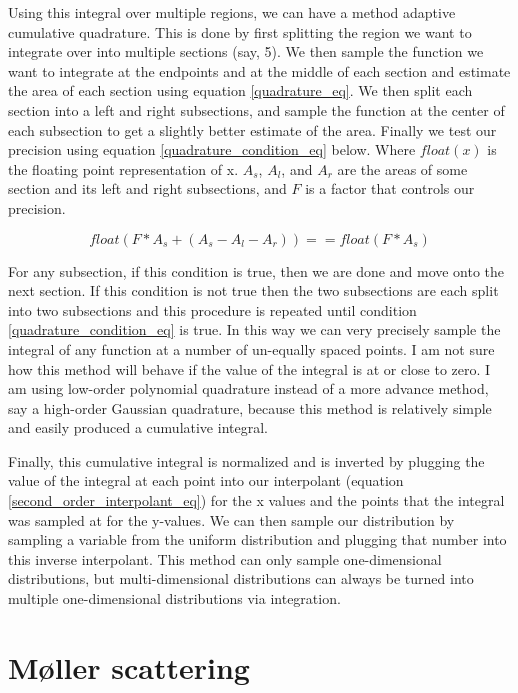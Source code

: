 \documentclass[]{article}
\begin{document}
Using this integral over multiple regions, we can have a method adaptive cumulative quadrature. This is done by first splitting the region we want to integrate over into multiple sections (say, 5). We then sample the function we want to integrate at the endpoints and at the middle of each section and estimate the area of each section using equation \ref{quadrature_eq}. We then split each section into a left and right subsections, and sample the function at the center of each subsection to get a slightly better estimate of the area.  Finally we test our precision using equation \ref{quadrature_condition_eq} below. Where $float(x)$ is the floating point representation of x. $A_s$, $A_l$, and $A_r$ are the areas of some section and its left and right subsections, and $F$ is a factor that controls our precision. 

\begin{equation}
\label{quadrature_condition_eq}
float(F*A_s + (A_s - A_l - A_r)) == float(F*A_s)
\end{equation}

For any subsection, if this condition is true, then we are done and move onto the next section. If this condition is not true then the two subsections are each split into two subsections and this procedure is repeated until condition \ref{quadrature_condition_eq} is true. In this way we can very precisely sample the integral of any function at a number of un-equally spaced points. I am not sure how this method will behave if the value of the integral is at or close to zero. I am using low-order polynomial quadrature instead of a more advance method, say a high-order Gaussian quadrature, because this method is relatively simple and easily produced a cumulative integral.

Finally, this cumulative integral is normalized and is inverted by plugging the value of the integral at each point into our interpolant (equation \ref{second_order_interpolant_eq}) for the x values and the points that the integral was sampled at for the y-values. We can then sample our distribution by sampling a variable from the uniform distribution and plugging that number into this inverse interpolant. This method can only sample one-dimensional distributions, but multi-dimensional distributions can always be turned into multiple one-dimensional distributions via integration.

\section{M\o ller scattering}
\end{document}
